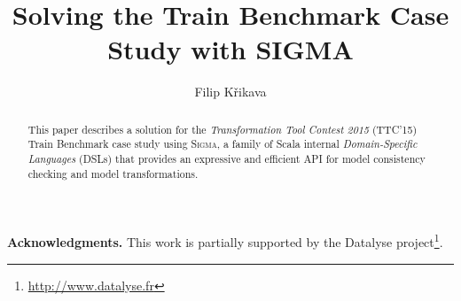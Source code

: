 \documentclass[submission]{eptcs}
\title{Solving the \TTC Train Benchmark Case Study with SIGMA}
\author{
  Filip Křikava
  \institute{Faculty of Information Technology}
  \institute{Czech Technical University, Czech Republic}
  \email{\href{mailto:filip.krikava@fit.cvut.cz}{filip.krikava@fit.cvut.cz}}
}
\newcommand{\SIGMA}{\textsc{Sigma}\xspace}
\newcommand{\TTC}{TTC'15\xspace}
\newcommand{\Paragraph}[1]{\vspace*{2mm} \noindent \textbf{#1.}}
\begin{document}
\maketitle

\begin{abstract}
This paper describes a solution for the \emph{Transformation Tool Contest 2015} (\TTC) Train Benchmark case study using \SIGMA, a family of Scala internal \emph{Domain-Specific Languages} (DSLs) that provides an expressive and efficient API for model consistency checking and model transformations.
\end{abstract}






\Paragraph{Acknowledgments}
This work is partially supported by the Datalyse project\footnote{\url{http://www.datalyse.fr}}.


	

\clearpage
\appendix


\end{document}

